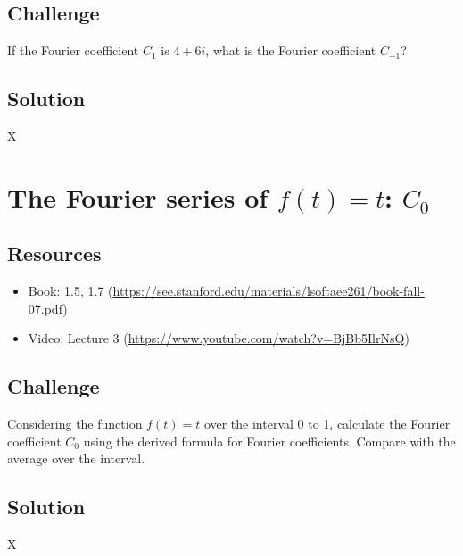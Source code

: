 \subsection*{Challenge}
If the Fourier coefficient $C_1$ is $4 + 6i$, what is the Fourier coefficient $C_{-1}$?

\subsection*{Solution}
X






\newpage

\section{The Fourier series of $f(t)=t$: $C_0$}

\subsection*{Resources}
\begin{itemize}
    \item Book: 1.5, 1.7 (\url{https://see.stanford.edu/materials/lsoftaee261/book-fall-07.pdf})
    \item Video: Lecture 3 (\url{https://www.youtube.com/watch?v=BjBb5IlrNsQ})
\end{itemize}

\subsection*{Challenge}
Considering the function $f(t)=t$ over the interval 0 to 1, calculate the Fourier coefficient $C_0$ using the derived formula for Fourier coefficients. Compare with the average over the interval.

\subsection*{Solution}
X





\newpage

